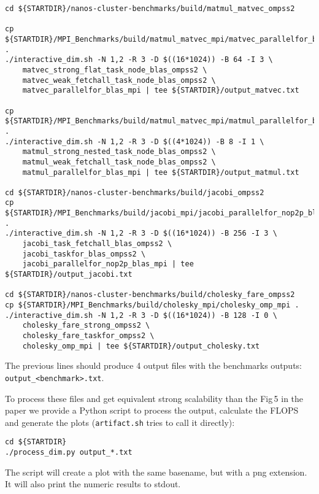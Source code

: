 \documentclass{article}
\newcommand{\code}[1]{\texttt{#1}}
\begin{document}
\begin{lstlisting}
cd ${STARTDIR}/nanos-cluster-benchmarks/build/matmul_matvec_ompss2

cp ${STARTDIR}/MPI_Benchmarks/build/matmul_matvec_mpi/matvec_parallelfor_blas_mpi .
./interactive_dim.sh -N 1,2 -R 3 -D $((16*1024)) -B 64 -I 3 \
	matvec_strong_flat_task_node_blas_ompss2 \
	matvec_weak_fetchall_task_node_blas_ompss2 \
	matvec_parallelfor_blas_mpi | tee ${STARTDIR}/output_matvec.txt

cp ${STARTDIR}/MPI_Benchmarks/build/matmul_matvec_mpi/matmul_parallelfor_blas_mpi .
./interactive_dim.sh -N 1,2 -R 3 -D $((4*1024)) -B 8 -I 1 \
	matmul_strong_nested_task_node_blas_ompss2 \
	matmul_weak_fetchall_task_node_blas_ompss2 \
	matmul_parallelfor_blas_mpi | tee ${STARTDIR}/output_matmul.txt

cd ${STARTDIR}/nanos-cluster-benchmarks/build/jacobi_ompss2
cp ${STARTDIR}/MPI_Benchmarks/build/jacobi_mpi/jacobi_parallelfor_nop2p_blas_mpi .
./interactive_dim.sh -N 1,2 -R 3 -D $((16*1024)) -B 256 -I 3 \
	jacobi_task_fetchall_blas_ompss2 \
	jacobi_taskfor_blas_ompss2 \
	jacobi_parallelfor_nop2p_blas_mpi | tee ${STARTDIR}/output_jacobi.txt

cd ${STARTDIR}/nanos-cluster-benchmarks/build/cholesky_fare_ompss2
cp ${STARTDIR}/MPI_Benchmarks/build/cholesky_mpi/cholesky_omp_mpi .
./interactive_dim.sh -N 1,2 -R 3 -D $((16*1024)) -B 128 -I 0 \
	cholesky_fare_strong_ompss2 \
	cholesky_fare_taskfor_ompss2 \
	cholesky_omp_mpi | tee ${STARTDIR}/output_cholesky.txt
\end{lstlisting}

The previous lines should produce 4 output files with the benchmarks
outputs: \code{output\_<benchmark>.txt}.

To process these files and get equivalent strong scalability than the
Fig\,5 in the paper we provide a Python script to process the output,
calculate the FLOPS and generate the plots (\code{artifact.sh} tries
to call it directly):

\begin{lstlisting}
cd ${STARTDIR}
./process_dim.py output_*.txt
\end{lstlisting}

The script will create a plot with the same basename, but with a png
extension. It will also print the numeric results to stdout.
\end{document}
